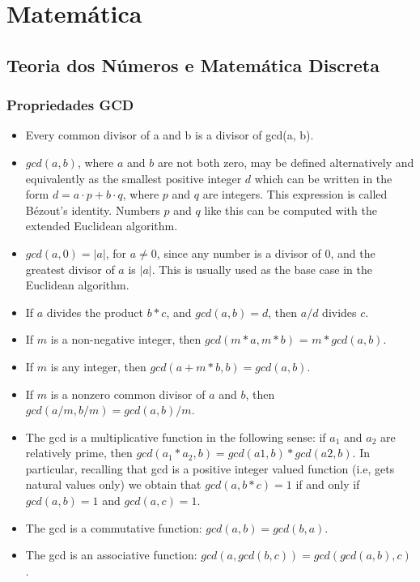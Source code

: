 \section{Matemática}

\subsection{Teoria dos Números e Matemática Discreta}

\subsubsection{Propriedades GCD}
  \begin{itemize}
    \item Every common divisor of a and b is a divisor of gcd(a, b).
    \item $gcd(a, b)$, where $a$ and $b$ are not both zero, may be defined alternatively and equivalently as the smallest positive integer $d$ which can be written in the form $d = a·p + b·q$, where $p$ and $q$ are integers. This expression is called Bézout's identity. Numbers $p$ and $q$ like this can be computed with the extended Euclidean algorithm.
    \item $gcd(a, 0) = |a|$, for $a \neq 0$, since any number is a divisor of $0$, and the greatest divisor of $a$ is $|a|$. This is usually used as the base case in the Euclidean algorithm.
    \item If $a$ divides the product $b*c$, and $gcd(a, b) = d$, then $a/d$ divides $c$.
    \item If $m$ is a non-negative integer, then $gcd(m*a, m*b)$ = $m*gcd(a, b)$.
    \item If $m$ is any integer, then $gcd(a + m*b, b) = gcd(a, b)$.
    \item If $m$ is a nonzero common divisor of $a$ and $b$, then $gcd(a/m, b/m) = gcd(a, b)/m$.
    \item The gcd is a multiplicative function in the following sense: if $a_1$ and $a_2$ are relatively prime, then $gcd(a_1*a_2, b) = gcd(a1, b)*gcd(a2, b)$. In particular, recalling that gcd is a positive integer valued function (i.e, gets natural values only) we obtain that $gcd(a, b*c) = 1$ if and only if $gcd(a, b) = 1$ and $gcd(a, c) = 1$.
    \item The gcd is a commutative function: $gcd(a, b) = gcd(b, a)$.
    \item The gcd is an associative function: $gcd(a, gcd(b, c)) = gcd(gcd(a, b), c)$.

\end{itemize}
